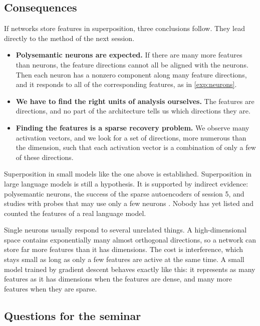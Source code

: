 \subsection{Consequences}

If networks store features in superposition, three conclusions follow. They lead directly to the method of the
next
session.
\begin{itemize}
\item \textbf{Polysemantic neurons are expected.} If there are many more features than neurons, the feature
directions cannot all be aligned with the neurons. Then each neuron has a nonzero component along many feature
directions, and it responds to all of the corresponding features, as in \cref{exp:neurons}.
\item \textbf{We have to find the right units of analysis ourselves.} The features are directions, and no part
of the architecture tells us which directions they are.
\item \textbf{Finding the features is a sparse recovery problem.} We observe many activation vectors, and we look
for a set of directions, more numerous than the dimension, such that each activation vector is a combination of
only a few of these directions.
\end{itemize}

\begin{caution}
Superposition in small models like the one above is established. Superposition in large language models is
still a hypothesis. It is supported by indirect evidence: polysemantic neurons, the success of the sparse
autoencoders of session 5, and studies with probes that may use only a few neurons \citep{gurnee2023finding}.
Nobody has yet listed and counted the features of a real language model.
\end{caution}

\begin{takeaways}
Single neurons usually respond to several unrelated things. A high-dimensional space contains exponentially
many almost orthogonal directions, so a network can store far more features than it has dimensions. The cost is
interference, which stays small as long as only a few features are active at the same time. A small model trained
by gradient descent behaves exactly like this: it represents as many features as it has dimensions when the
features are dense, and many more features when they are sparse.
\end{takeaways}

\subsection*{Questions for the seminar}

